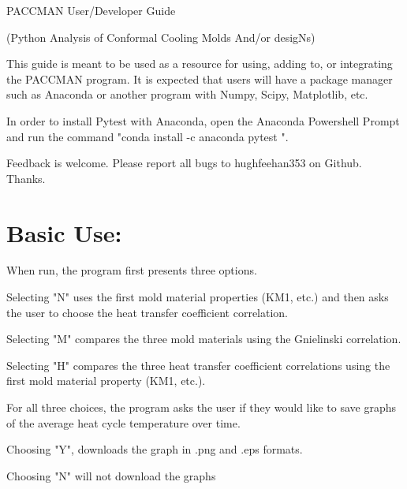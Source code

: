 \documentclass[a4paper,12pt]{article}
\begin{document}
\setlength{\parindent}{0em}
\doublespacing
\captionsetup{labelformat=empty}

\begin{center}
{\huge PACCMAN User/Developer Guide}

(Python Analysis of Conformal Cooling Molds And/or desigNs)
\end{center}

\bigskip

This guide is meant to be used as a resource for using, adding to, or integrating the PACCMAN program. 
It is expected that users will have a package manager such as Anaconda or another program with Numpy, Scipy, Matplotlib, etc.

\medskip

In order to install Pytest with Anaconda, open the Anaconda Powershell Prompt and run the command "conda install -c anaconda pytest ".

\medskip

Feedback is welcome. Please report all bugs to hughfeehan353 on Github. Thanks.

\section*{Basic Use:}

When run, the program first presents three options.
\begin{adjustwidth}{1cm}{}
Selecting "N" uses the first mold material properties (KM1, etc.) and then asks the user to choose the heat transfer coefficient correlation.

Selecting "M" compares the three mold materials using the Gnielinski correlation.

Selecting "H" compares the three heat transfer coefficient correlations using the first mold material property (KM1, etc.).
\end{adjustwidth}

\medskip

For all three choices, the program asks the user if they would like to save graphs of the average heat cycle temperature over time.
\begin{adjustwidth}{1cm}{}
Choosing "Y", downloads the graph in .png and .eps formats.

Choosing "N" will not download the graphs
\end{adjustwidth}
\clearpage
\end{document}
